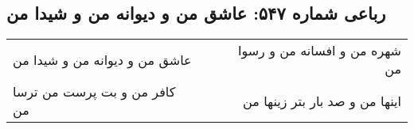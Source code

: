 \begin{center}
\section*{رباعی شماره ۵۴۷: عاشق من و دیوانه من و شیدا من}
\label{sec:sh547}
\begin{longtable}{l p{0.5cm} r}
عاشق من و دیوانه من و شیدا من
&&
شهره من و افسانه من و رسوا من
\\
کافر من و بت پرست من ترسا من
&&
اینها من و صد بار بتر زینها من
\\
\end{longtable}
\end{center}
